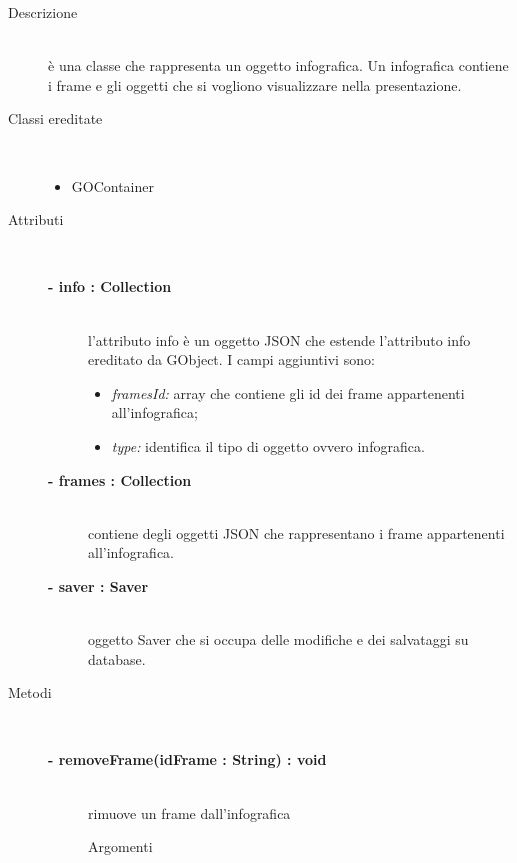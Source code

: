 \begin{description}
\item[Descrizione] \hfill \\
	è una classe che rappresenta un oggetto infografica. Un infografica contiene i frame e gli oggetti che si vogliono visualizzare nella presentazione.
	
\item[Classi ereditate] \hfill \\
	\begin{itemize}
		\item GOContainer
	\end{itemize}
	
\item[Attributi] \hfill \\
	\begin{description}
		\item[\textbf{- info : Collection			}] \hfill \\
			l'attributo info è un oggetto JSON che estende l'attributo info ereditato da GObject. I campi aggiuntivi sono:
	\begin{itemize}
		\item \textit{framesId:} array che contiene gli id dei frame appartenenti all'infografica;
		\item \textit{type:} identifica il tipo di oggetto ovvero infografica.		
	\end{itemize}
		\item[\textbf{- frames : Collection			}] \hfill \\
			contiene degli oggetti JSON che rappresentano i frame appartenenti all'infografica.
		\item[\textbf{- saver : Saver			}] \hfill \\
			oggetto Saver che si occupa delle modifiche e dei salvataggi su database.
	\end{description}	
	
\item[Metodi] \hfill \\

		\begin{description}
		\item[\textbf{\color{blue}- removeFrame(idFrame : String) : void			}] \hfill \\
			rimuove un frame dall'infografica
			
		\begin{description}
			\item[Argomenti] \hfill \\
				\begin{itemize}
				

\end{itemize}
\end{description}
\end{description}
\end{description}
